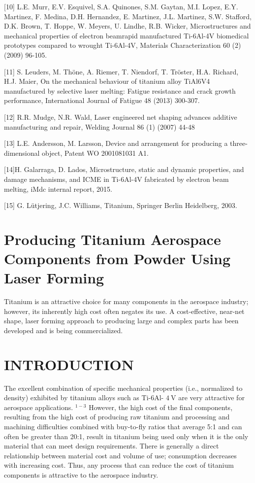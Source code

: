 \documentclass[10pt]{article}
\begin{document}
[10] L.E. Murr, E.V. Esquivel, S.A. Quinones, S.M. Gaytan, M.I. Lopez, E.Y. Martinez, F. Medina, D.H. Hernandez, E. Martinez, J.L. Martinez, S.W. Stafford, D.K. Brown, T. Hoppe, W. Meyers, U. Lindhe, R.B. Wicker, Microstructures and mechanical properties of electron beamrapid manufactured Ti-6Al-4V biomedical prototypes compared to wrought Ti-6Al-4V, Materials Characterization 60 (2) (2009) 96-105.

[11] S. Leuders, M. Thöne, A. Riemer, T. Niendorf, T. Tröster, H.A. Richard, H.J. Maier, On the mechanical behaviour of titanium alloy TiAl6V4 manufactured by selective laser melting: Fatigue resistance and crack growth performance, International Journal of Fatigue 48 (2013) 300-307.

[12] R.R. Mudge, N.R. Wald, Laser engineered net shaping advances additive manufacturing and repair, Welding Journal 86 (1) (2007) 44-48

[13] L.E. Andersson, M. Larsson, Device and arrangement for producing a three-dimensional object, Patent WO 2001081031 A1.

[14]H. Galarraga, D. Lados, Microstructure, static and dynamic properties, and damage mechanisms, and ICME in Ti-6Al-4V fabricated by electron beam melting, iMdc internal report, 2015.

[15] G. Lütjering, J.C. Williams, Titanium, Springer Berlin Heidelberg, 2003.

\section*{Producing Titanium Aerospace Components from Powder Using Laser Forming }
Titanium is an attractive choice for many components in the aerospace industry; however, its inherently high cost often negates its use. A cost-effective, near-net shape, laser forming approach to producing large and complex parts has been developed and is being commercialized.

\section*{INTRODUCTION}
The excellent combination of specific mechanical properties (i.e., normalized to density) exhibited by titanium alloys such as Ti-6Al- $4 \mathrm{~V}$ are very attractive for aerospace applications. ${ }^{1-3}$ However, the high cost of the final components, resulting from the high cost of producing raw titanium and processing and machining difficulties combined with buy-to-fly ratios that average 5:1 and can often be greater than 20:1, result in titanium being used only when it is the only material that can meet design requirements. There is generally a direct relationship between material cost and volume of use; consumption decreases with increasing cost. Thus, any process that can reduce the cost of titanium components is attractive to the aerospace industry.
\end{document}
